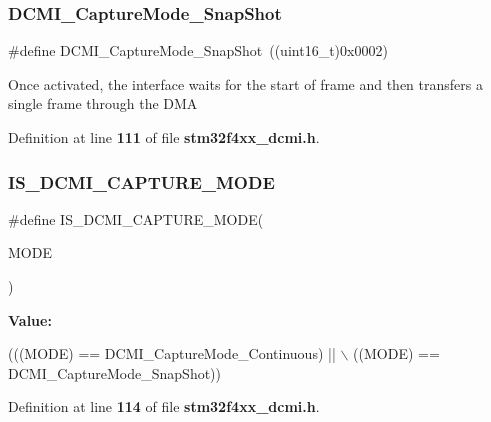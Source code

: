 \mbox{\label{group__DCMI__Capture__Mode_ga2be97e0095cc139fa20fe07a74c81fd0}} 
\subsubsection{D\+C\+M\+I\+\_\+\+Capture\+Mode\+\_\+\+Snap\+Shot}
{\footnotesize\ttfamily \#define D\+C\+M\+I\+\_\+\+Capture\+Mode\+\_\+\+Snap\+Shot~((uint16\+\_\+t)0x0002)}

Once activated, the interface waits for the start of frame and then transfers a single frame through the D\+MA 

Definition at line \textbf{ 111} of file \textbf{ stm32f4xx\+\_\+dcmi.\+h}.

\mbox{\label{group__DCMI__Capture__Mode_ga138eda82f23ad7c714ed6408edfc8ae5}} 
\subsubsection{I\+S\+\_\+\+D\+C\+M\+I\+\_\+\+C\+A\+P\+T\+U\+R\+E\+\_\+\+M\+O\+DE}
{\footnotesize\ttfamily \#define I\+S\+\_\+\+D\+C\+M\+I\+\_\+\+C\+A\+P\+T\+U\+R\+E\+\_\+\+M\+O\+DE(\begin{DoxyParamCaption}\item[{}]{M\+O\+DE }\end{DoxyParamCaption})}

{\bfseries Value\+:}
\begin{DoxyCode}
(((MODE) == DCMI_CaptureMode_Continuous) || \(\backslash\)
                                   ((MODE) == DCMI_CaptureMode_SnapShot))
\end{DoxyCode}


Definition at line \textbf{ 114} of file \textbf{ stm32f4xx\+\_\+dcmi.\+h}.

